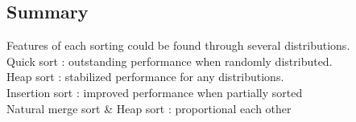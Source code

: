 \documentclass{article}
\begin{document}
\subsection{Summary}
Features of each sorting could be found through several distributions.\\
Quick sort : outstanding performance when randomly distributed.\\
Heap sort : stabilized performance for any distributions.\\
Insertion sort : improved performance when partially sorted\\
Natural merge sort \& Heap sort : proportional each other
\end{document}
